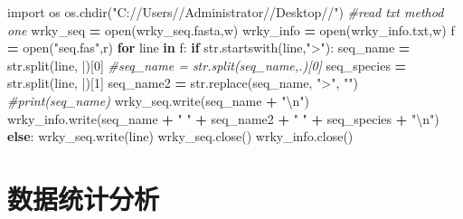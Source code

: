 \documentclass[
  10pt,
]{book}
\newenvironment{Shaded}{\begin{snugshade}}{\end{snugshade}}
\newcommand{\BuiltInTok}[1]{#1}
\newcommand{\CharTok}[1]{\textcolor[rgb]{0.31,0.60,0.02}{#1}}
\newcommand{\CommentTok}[1]{\textcolor[rgb]{0.56,0.35,0.01}{\textit{#1}}}
\newcommand{\ControlFlowTok}[1]{\textcolor[rgb]{0.13,0.29,0.53}{\textbf{#1}}}
\newcommand{\DecValTok}[1]{\textcolor[rgb]{0.00,0.00,0.81}{#1}}
\newcommand{\ImportTok}[1]{#1}
\newcommand{\KeywordTok}[1]{\textcolor[rgb]{0.13,0.29,0.53}{\textbf{#1}}}
\newcommand{\NormalTok}[1]{#1}
\newcommand{\OperatorTok}[1]{\textcolor[rgb]{0.81,0.36,0.00}{\textbf{#1}}}
\newcommand{\StringTok}[1]{\textcolor[rgb]{0.31,0.60,0.02}{#1}}
\begin{document}
\begin{Shaded}
\begin{Highlighting}[]
\ImportTok{import}\NormalTok{ os}
\NormalTok{os.chdir(}\StringTok{"C://Users//Administrator//Desktop//"}\NormalTok{)}
\CommentTok{\#read txt method one}
\NormalTok{wrky\_seq }\OperatorTok{=} \BuiltInTok{open}\NormalTok{(}\StringTok{\textquotesingle{}wrky\_seq.fasta\textquotesingle{}}\NormalTok{,}\StringTok{\textquotesingle{}w\textquotesingle{}}\NormalTok{)}
\NormalTok{wrky\_info }\OperatorTok{=} \BuiltInTok{open}\NormalTok{(}\StringTok{\textquotesingle{}wrky\_info.txt\textquotesingle{}}\NormalTok{,}\StringTok{\textquotesingle{}w\textquotesingle{}}\NormalTok{)}
\NormalTok{f }\OperatorTok{=} \BuiltInTok{open}\NormalTok{(}\StringTok{"seq.fas"}\NormalTok{,}\StringTok{\textquotesingle{}r\textquotesingle{}}\NormalTok{)}
\ControlFlowTok{for}\NormalTok{ line }\KeywordTok{in}\NormalTok{ f:}
    \ControlFlowTok{if} \BuiltInTok{str}\NormalTok{.startswith(line,}\StringTok{"\textgreater{}"}\NormalTok{):}
\NormalTok{        seq\_name }\OperatorTok{=} \BuiltInTok{str}\NormalTok{.split(line, }\StringTok{\textquotesingle{}|\textquotesingle{}}\NormalTok{)[}\DecValTok{0}\NormalTok{]}
        \CommentTok{\#seq\_name = str.split(seq\_name,\textquotesingle{}.\textquotesingle{})[0]}
\NormalTok{        seq\_species }\OperatorTok{=} \BuiltInTok{str}\NormalTok{.split(line, }\StringTok{\textquotesingle{}|\textquotesingle{}}\NormalTok{)[}\DecValTok{1}\NormalTok{]}
\NormalTok{        seq\_name2 }\OperatorTok{=} \BuiltInTok{str}\NormalTok{.replace(seq\_name, }\StringTok{"\textgreater{}"}\NormalTok{, }\StringTok{""}\NormalTok{)}
        \CommentTok{\#print(seq\_name)}
\NormalTok{        wrky\_seq.write(seq\_name }\OperatorTok{+} \StringTok{"}\CharTok{\textbackslash{}n}\StringTok{"}\NormalTok{)}
\NormalTok{        wrky\_info.write(seq\_name }\OperatorTok{+} \StringTok{"    "} \OperatorTok{+}\NormalTok{ seq\_name2 }\OperatorTok{+} \StringTok{"    "} \OperatorTok{+}\NormalTok{ seq\_species }\OperatorTok{+} \StringTok{"}\CharTok{\textbackslash{}n}\StringTok{"}\NormalTok{)}
    \ControlFlowTok{else}\NormalTok{:}
\NormalTok{        wrky\_seq.write(line)}
\NormalTok{wrky\_seq.close()}
\NormalTok{wrky\_info.close()}
\end{Highlighting}
\end{Shaded}

\hypertarget{python-stat}{%
\chapter{数据统计分析}\label{python-stat}}
\end{document}
